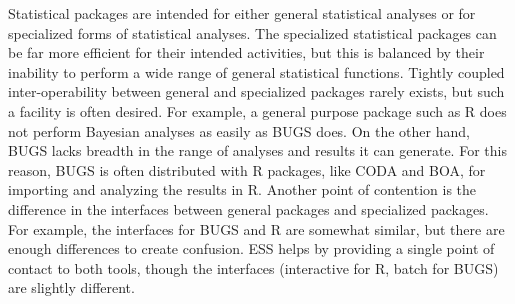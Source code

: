 \documentclass{article}
\newcommand{\stexttt}[1]{{\small\texttt{#1}}}
\newenvironment{Comment}{\begin{quote}\small\itshape }{\end{quote}}
\begin{document}
Statistical packages are intended for either general statistical
analyses or for specialized forms of statistical analyses.  The
specialized statistical packages can be far more efficient for their
intended activities, but this is balanced by their inability to
perform a wide range of general statistical functions.  Tightly
coupled inter-operability between general and specialized packages
rarely exists, but such a facility is often desired.  For example, a
general purpose package such as R does not perform Bayesian analyses
as easily as BUGS does.  On the other hand, BUGS lacks breadth in the
range of analyses and results it can generate.  For this reason, BUGS
is often distributed with R packages, like CODA and BOA, for importing
and analyzing the results in R.  Another point of contention is the
difference in the interfaces between general packages and specialized
packages.  For example, the interfaces for BUGS and R are somewhat
similar, but there are enough differences to create confusion.  ESS
helps by providing a single point of contact to both tools, though the
interfaces (interactive for R, batch for BUGS) are slightly different.



\end{document}
